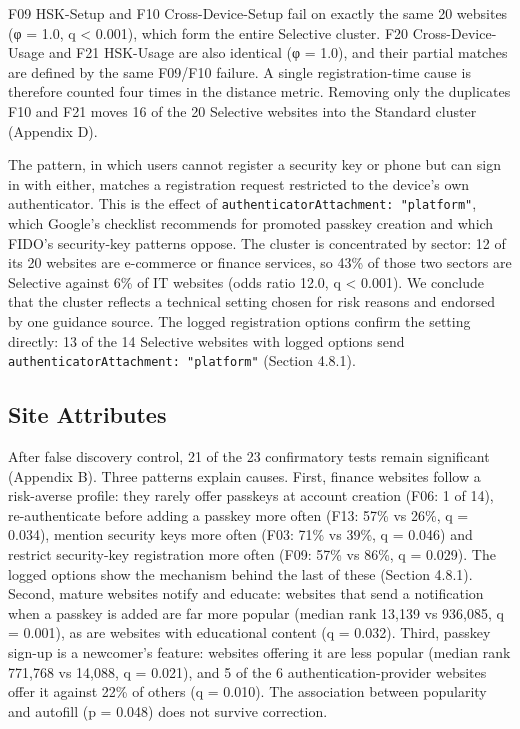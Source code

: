 \documentclass[letterpaper,twocolumn,10pt]{article}
\begin{document}
F09 HSK-Setup and F10 Cross-Device-Setup fail on exactly the same 20 websites (φ = 1.0, q \textless{} 0.001), which form the entire Selective cluster. F20 Cross-Device-Usage and F21 HSK-Usage are also identical (φ = 1.0), and their partial matches are defined by the same F09/F10 failure. A single registration-time cause is therefore counted four times in the distance metric. Removing only the duplicates F10 and F21 moves 16 of the 20 Selective websites into the Standard cluster (Appendix D).

The pattern, in which users cannot register a security key or phone but can sign in with either, matches a registration request restricted to the device's own authenticator. This is the effect of \texttt{authenticatorAttachment:\ "platform"}, which Google's checklist recommends for promoted passkey creation and which FIDO's security-key patterns oppose. The cluster is concentrated by sector: 12 of its 20 websites are e-commerce or finance services, so 43\% of those two sectors are Selective against 6\% of IT websites (odds ratio 12.0, q \textless{} 0.001). We conclude that the cluster reflects a technical setting chosen for risk reasons and endorsed by one guidance source. The logged registration options confirm the setting directly: 13 of the 14 Selective websites with logged options send \texttt{authenticatorAttachment:\ "platform"} (Section 4.8.1).

\subsection{Site Attributes}

After false discovery control, 21 of the 23 confirmatory tests remain significant (Appendix B). Three patterns explain causes. First, finance websites follow a risk-averse profile: they rarely offer passkeys at account creation (F06: 1 of 14), re-authenticate before adding a passkey more often (F13: 57\% vs 26\%, q = 0.034), mention security keys more often (F03: 71\% vs 39\%, q = 0.046) and restrict security-key registration more often (F09: 57\% vs 86\%, q = 0.029). The logged options show the mechanism behind the last of these (Section 4.8.1). Second, mature websites notify and educate: websites that send a notification when a passkey is added are far more popular (median rank 13,139 vs 936,085, q = 0.001), as are websites with educational content (q = 0.032). Third, passkey sign-up is a newcomer's feature: websites offering it are less popular (median rank 771,768 vs 14,088, q = 0.021), and 5 of the 6 authentication-provider websites offer it against 22\% of others (q = 0.010). The association between popularity and autofill (p = 0.048) does not survive correction.
\end{document}
